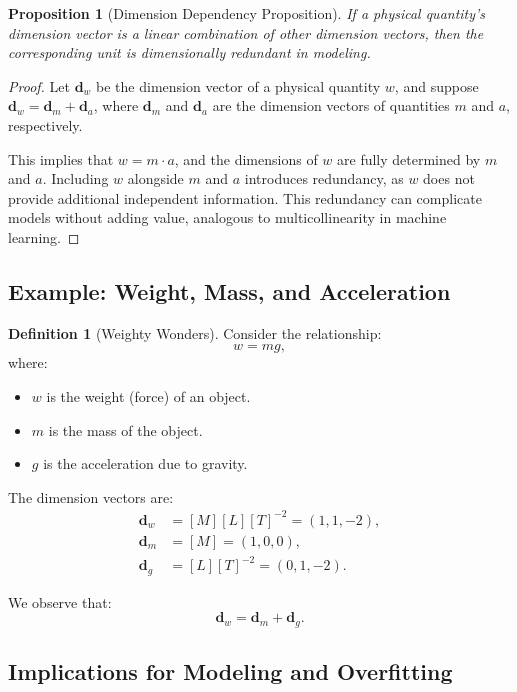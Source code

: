 \documentclass{article}
\newtheorem{proposition}{Proposition}[section]
\theoremstyle{definition}
\newtheorem{definition}{Definition}[section]
\theoremstyle{remark}
\begin{document}
	\begin{proposition}[Dimension Dependency Proposition]
		If a physical quantity's dimension vector is a linear combination of other dimension vectors, then the corresponding unit is \emph{dimensionally redundant} in modeling.
	\end{proposition}
	
	\begin{proof}
		Let $\mathbf{d}_w$ be the dimension vector of a physical quantity $w$, and suppose $\mathbf{d}_w = \mathbf{d}_m + \mathbf{d}_a$, where $\mathbf{d}_m$ and $\mathbf{d}_a$ are the dimension vectors of quantities $m$ and $a$, respectively.
		
		This implies that $w = m \cdot a$, and the dimensions of $w$ are fully determined by $m$ and $a$. Including $w$ alongside $m$ and $a$ introduces redundancy, as $w$ does not provide additional independent information. This redundancy can complicate models without adding value, analogous to multicollinearity in machine learning.
	\end{proof}
	
	\subsection{Example: Weight, Mass, and Acceleration}
	
	\begin{definition}[Weighty Wonders]
		Consider the relationship:
		\[
		w = m g,
		\]
		where:
		\begin{itemize}
			\item $w$ is the weight (force) of an object.
			\item $m$ is the mass of the object.
			\item $g$ is the acceleration due to gravity.
		\end{itemize}
	\end{definition}
	
	The dimension vectors are:
	\begin{align*}
		\mathbf{d}_w &= [M][L][T]^{-2} = (1,1,-2), \\
		\mathbf{d}_m &= [M] = (1,0,0), \\
		\mathbf{d}_g &= [L][T]^{-2} = (0,1,-2).
	\end{align*}
	
	We observe that:
	\[
	\mathbf{d}_w = \mathbf{d}_m + \mathbf{d}_g.
	\]
	
	\subsection{Implications for Modeling and Overfitting}
	
\end{document}
